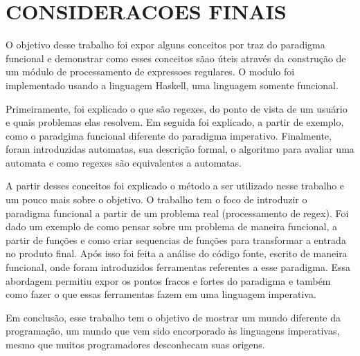 \section{CONSIDERACOES FINAIS}

O objetivo desse trabalho foi expor alguns conceitos por traz do paradigma funcional e demonstrar como esses conceitos sãao úteis através da construção de um módulo de processamento de expressoes regulares.
O modulo foi implementado usando a linguagem Haskell, uma linguagem somente funcional.

Primeiramente, foi explicado o que são regexes, do ponto de vista de um usuário e quais problemas elas resolvem.
Em seguida foi explicado, a partir de exemplo, como o paradgima funcional diferente do paradigma imperativo.
Finalmente, foram introduzidas automatas, sua descrição formal, o algoritmo para avaliar uma automata e como regexes são equivalentes a automatas.

A partir desses conceitos foi explicado o método a ser utilizado nesse trabalho e um pouco mais sobre o objetivo.
O trabalho tem o foco de introduzir o paradigma funcional a partir de um problema real (processamento de regex).
Foi dado um exemplo de como pensar sobre um problema de maneira funcional, a partir de funções e como criar sequencias de funções para transformar a entrada no produto final.
Após isso foi feita a análise do código fonte, escrito de maneira funcional, onde foram introduzidos ferramentas referentes a esse paradigma.
Essa abordagem permitiu expor os pontos fracos e fortes do paradigma e também como fazer o que essas ferramentas fazem em uma linguagem imperativa.

Em conclusão, esse trabalho tem o objetivo de mostrar um mundo diferente da programação, um mundo que vem sido encorporado às linguagens imperativas, mesmo que muitos programadores desconhecam suas origens.


